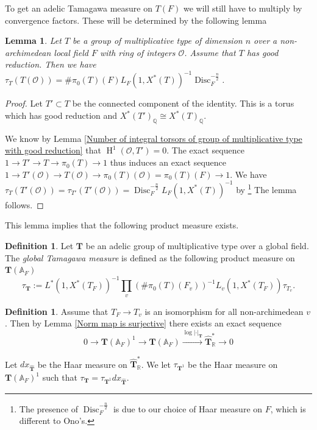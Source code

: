 \documentclass[a4paper,11pt,reqno]{amsart}
\newcommand{\Q}{\mathbb{Q}}
\newcommand{\R}{\mathbb{R}}
\newcommand{\A}{\mathbb{A}}
\DeclareMathOperator{\HH}{H}
\DeclareMathOperator{\Disc}{Disc}
\newtheorem{lemma}[theorem]{Lemma}
\theoremstyle{definition}
\newtheorem{definition}[theorem]{Definition}
\begin{document}
To get an adelic Tamagawa measure on $T(F)$ we will still have to multiply by convergence factors. These will be determined by the following lemma
\begin{lemma}\label{lem:Computation of local volume of groups of multiplicative type}
	Let $T$ be a group of multiplicative type of dimension $n$ over a non-archimedean local field $F$ with ring of integers $\mathcal{O}$. Assume that $T$ has good reduction. Then we have $\tau_{T}(T(\mathcal{O})) = \# \pi_0(T)(F) L_F(1, X^*(T))^{-1}\Disc_{F}^{-\frac{n}{2}}$.
\end{lemma}
\begin{proof}
	Let $T' \subset T$ be the connected component of the identity. This is a torus which has good reduction and $X^*(T')_{\Q} \cong X^*(T)_{\Q}$.
	
	We know by Lemma \ref{Number of integral torsors of group of multiplicative type with good reduction} that $\HH^1(\mathcal{O}, T') = 0$. The exact sequence $1 \to T' \to T \to \pi_0(T) \to 1$ thus induces an exact sequence $1 \to T'(\mathcal{O}) \to T(\mathcal{O}) \to \pi_0(T)(\mathcal{O}) = \pi_0(T)(F) \to 1$. We have $\tau_{T}(T'(\mathcal{O})) = \tau_{T'}(T'(\mathcal{O})) = \Disc_{F}^{-\frac{n}{2}} L_F(1, X^*(T))^{-1}$ by \cite[\S 3.3]{Ono191Arithmetic} \footnote{The presence of $\Disc_{F}^{-\frac{n}{2}}$ is due to our choice of Haar measure on $F$, which is different to Ono's.} The lemma follows.
\end{proof}

This lemma implies that the following product measure exists.
\begin{definition}
	Let $\mathbf{T}$ be an adelic group of multiplicative type over a global field. The \emph{global Tamagawa measure} is defined as the following product measure on $\mathbf{T}(\A_F)$
	\[
	\tau_{\mathbf{T}} := L^*(1, X^*(T_F))^{-1} \prod_v (\# \pi_0(T)(F_v))^{-1} L_v(1, X^*(T_F)) \tau_{T_v}.
	\]
\end{definition}

\begin{definition}
	Assume that $T_F \to T_v$ is an isomorphism for all non-archimedean $v$. Then by Lemma \ref{Norm map is surjective} there exists an exact sequence 
	\[0 \to \mathbf{T}(\A_F)^1 \to \mathbf{T}(\A_F) \xrightarrow{\log |\cdot|_{\mathbf{T}}} \hat{\mathbf{T}}_{\R}^* \to 0\]
	
	Let $dx_{\hat{\mathbf{T}}}$ be the Haar measure on $\hat{\mathbf{T}}_{\R}^*$. We let $\tau_{\mathbf{T}^1}$ be the Haar measure on $\mathbf{T}(\A_F)^1$ such that $\tau_{\mathbf{T}} = \tau_{\mathbf{T}^1} dx_{\hat{\mathbf{T}}}$.
\end{definition}
\end{document}
